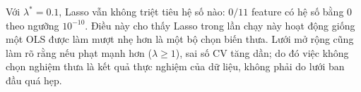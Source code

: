 Với $\lambda^* = 0.1$, Lasso vẫn không triệt tiêu hệ số nào: $0/11$ feature có hệ số bằng
0 theo ngưỡng $10^{-10}$. Điều này cho thấy Lasso trong lần chạy này hoạt động giống một OLS được
làm mượt nhẹ hơn là một bộ chọn biến thưa. Lưới mở rộng cũng làm rõ rằng nếu phạt mạnh hơn
($\lambda \ge 1$), sai số CV tăng dần; do đó việc không chọn nghiệm thưa là kết quả thực nghiệm
của dữ liệu, không phải do lưới ban đầu quá hẹp.


